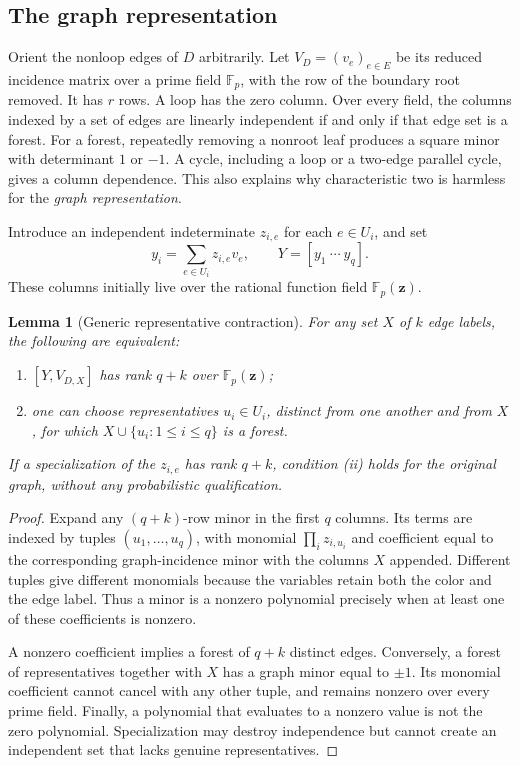 \documentclass[11pt,letterpaper]{article}
\newtheorem{lemma}[theorem]{Lemma}
\theoremstyle{definition}
\newcommand{\F}{\mathbb F}
\begin{document}
\subsection{The graph representation}
Orient the nonloop edges of $D$ arbitrarily. Let
$V_D=(v_e)_{e\in E}$ be its reduced incidence matrix over a prime field
$\F_p$, with the row of the boundary root removed. It has $r$ rows.
A loop has the zero column. Over every field, the columns indexed by a set
of edges are linearly independent if and only if that edge set is a forest.
For a forest, repeatedly removing a nonroot leaf produces a square minor
with determinant $1$ or $-1$. A cycle, including a loop or a two-edge
parallel cycle, gives a column dependence. This also explains why
characteristic two is harmless for the \emph{graph representation}.

Introduce an independent indeterminate $z_{i,e}$ for each $e\in U_i$, and set
\begin{equation}\label{eq:generic-y}
 y_i=\sum_{e\in U_i}z_{i,e}v_e,\qquad
 Y=[y_1\ \cdots\ y_q].
\end{equation}
These columns initially live over the rational function field
$\F_p(\mathbf z)$.

\begin{lemma}[Generic representative contraction]\label{lem:generic}
For any set $X$ of $k$ edge labels, the following are equivalent:
\begin{enumerate}[label=(\roman*)]
\item $[Y,V_{D,X}]$ has rank $q+k$ over $\F_p(\mathbf z)$;
\item one can choose representatives $u_i\in U_i$, distinct from one another
and from $X$, for which $X\cup\{u_i:1\leq i\leq q\}$ is a forest.
\end{enumerate}
If a specialization of the $z_{i,e}$ has rank $q+k$, condition (ii) holds
for the original graph, without any probabilistic qualification.
\end{lemma}
\begin{proof}
Expand any $(q+k)$-row minor in the first $q$ columns. Its terms are indexed
by tuples $(u_1,\ldots,u_q)$, with monomial
$\prod_i z_{i,u_i}$ and coefficient equal to the corresponding graph-incidence
minor with the columns $X$ appended. Different tuples give different
monomials because the variables retain both the color and the edge label.
Thus a minor is a nonzero polynomial precisely when at least one of these
coefficients is nonzero.

A nonzero coefficient implies a forest of $q+k$ distinct edges. Conversely,
a forest of representatives together with $X$ has a graph minor equal to
$\pm1$. Its monomial coefficient cannot cancel with any other tuple, and
remains nonzero over every prime field. Finally, a polynomial that evaluates
to a nonzero value is not the zero polynomial. Specialization may destroy
independence but cannot create an independent set that lacks genuine
representatives.
\end{proof}
\end{document}
